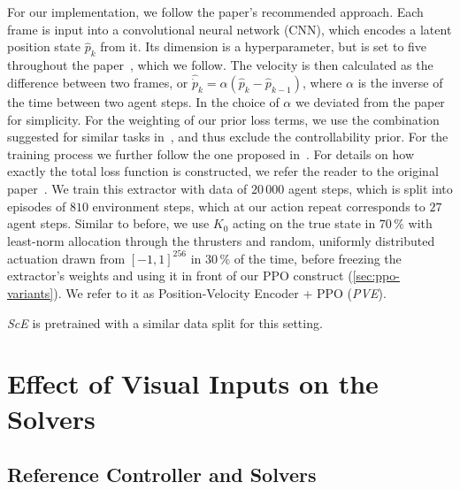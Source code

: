 For our implementation, we follow the paper's recommended approach. Each frame is input
into a convolutional neural network (CNN), which encodes a latent position state $\hat{p}_k$
from it. Its dimension is a hyperparameter, but is set to five throughout the paper~\cite[Sec.~III-C]{Jonschkowski2017PVE},
which we follow. The velocity is then calculated as the difference between two frames,
or $\hat{\dot{p}}_k = \alpha \left(\hat{p}_k - \hat{p}_{k-1}\right)$, where
$\alpha$ is the inverse of the time between two agent steps. In the choice of $\alpha$ we deviated from the paper for simplicity. 
For the weighting of our prior loss terms, we use the combination suggested for similar tasks in~\cite[Tab.~I]{Jonschkowski2017PVE}, and thus
exclude the controllability prior. For the training process we further follow the one proposed in~\cite[Sec.~III-C]{Jonschkowski2017PVE}.
For details on how exactly the total loss function is constructed, we refer the reader to the original paper~\cite{Jonschkowski2017PVE}.
We train this extractor with data of $20\,000$ agent steps, which is split into episodes of $810$ environment steps,
which at our action repeat corresponds to $27$ agent steps. Similar to before, we use $K_0$ acting on the true
state in $70\,\%$ with least-norm allocation through the thrusters and random, uniformly distributed actuation drawn from
$[-1, 1]^{256}$ in $30\,\%$ of the time,
before freezing the extractor's weights and using it in front of our PPO construct (\cref{sec:ppo-variants}).
We refer to it as Position-Velocity Encoder + PPO (\emph{PVE}).

\emph{ScE} is pretrained with a similar data split for this setting.

\section{Effect of Visual Inputs on the Solvers}
\label{sec:visual-inputs}

\subsection{Reference Controller and Solvers}
\label{subsec:visual-inputs-setting}

